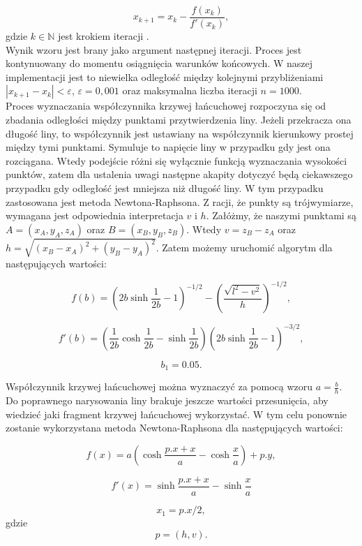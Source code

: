 \[
	x_{k+1} = x_k - \frac{f(x_k)}{f'(x_k)},
\]
gdzie $k \in \mathbb{N}$ jest krokiem iteracji .
\\

Wynik wzoru jest brany jako argument następnej iteracji. Proces jest kontynuowany do momentu osiągnięcia warunków końcowych. W naszej implementacji jest to niewielka odległość między kolejnymi przybliżeniami $ | x_{k+1} - x_k | < \varepsilon$, $\varepsilon = 0,001$ oraz maksymalna liczba iteracji $n=1000$.
\\

Proces wyznaczania współczynnika krzywej łańcuchowej rozpoczyna się od zbadania odległości między punktami przytwierdzenia liny. Jeżeli przekracza ona długość liny, to współczynnik jest ustawiany na współczynnik kierunkowy prostej między tymi punktami. Symuluje to napięcie liny w przypadku gdy jest ona rozciągana. Wtedy podejście różni się wyłącznie funkcją wyznaczania wysokości punktów, zatem dla ustalenia uwagi następne akapity dotyczyć będą ciekawszego przypadku gdy odległość jest mniejsza niż długość liny. W tym przypadku zastosowana jest metoda Newtona-Raphsona. Z racji, że punkty są trójwymiarze, wymagana jest odpowiednia interpretacja $v$ i $h$. Załóżmy, że naszymi punktami są $A = (x_A, y_A, z_A)$ oraz $B= (x_B, y_B, z_B)$. Wtedy $v = z_B - z_A$ oraz $ h = \sqrt{(x_B - x_A)^2 + (y_B - y_A)^2}$. Zatem możemy uruchomić algorytm dla następujących wartości:

$$
	f(b) = \left( 2b\sinh\frac{1}{2b} - 1 \right)^{-1/2} - \left( \frac{\sqrt{l^2 - v^2}}{h} \right)^{-1/2},
$$

$$
	f'(b) = \left( \frac{1}{2b} \cosh \frac{1}{2b} - \sinh \frac{1}{2b} \right) \left( 2b \sinh \frac{1}{2b} - 1 \right) ^ {-3/2},
$$

$$
b_1 = 0.05. 
$$

Współczynnik krzywej łańcuchowej można wyznaczyć za pomocą wzoru $a = \frac{b}{h}$.
\\

Do poprawnego narysowania liny brakuje jeszcze wartości przesunięcia, aby wiedzieć jaki fragment krzywej łańcuchowej wykorzystać. W tym celu ponownie zostanie wykorzystana metoda Newtona-Raphsona dla następujących wartości:


$$
f(x) =  a \left( \cosh \frac{p.x + x}{a} - \cosh \frac{x}{a} \right) + p.y,
$$

$$
f'(x) = \sinh \frac{p.x + x}{a} - \sinh \frac{x}{a}
$$

$$
x_1 = p.x / 2,
$$
gdzie
$$
p = (h, v).
$$

